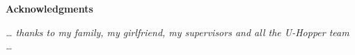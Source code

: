 \thispagestyle{empty}

\begin{center}
  {\bf \Huge Acknowledgments}
\end{center}

\vspace{4cm}


\emph{
  \dots{ thanks to my family, my girlfriend, my supervisors and all the U-Hopper team }\dots
}
